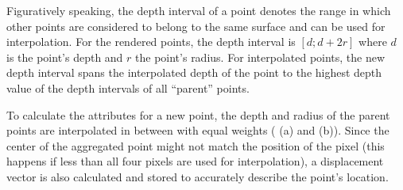 Figuratively speaking, the depth interval of a point denotes the range in which other points are considered to belong to the same surface and can be used for interpolation. For the rendered points, the depth interval is  $[d;d+2r]$ where $d$ is the point's depth and $r$ the point's radius. For interpolated points, the new depth interval spans the interpolated depth of the point to the highest depth value of the depth intervals of all ``parent'' points.

To calculate the attributes for a new point, the depth and radius of the parent points are interpolated in between with equal weights ( (a) and (b)). Since the center of the aggregated point might not match the position of the pixel (this happens if less than all four pixels are used for interpolation), a displacement vector is also calculated and stored to accurately describe the point's location.


